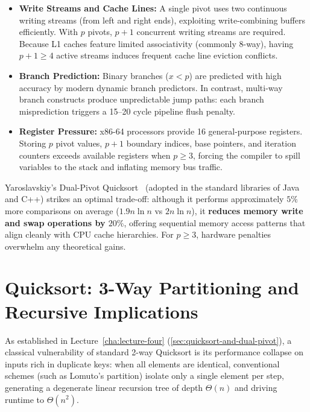 \begin{itemize}
  \item \textbf{Write Streams and Cache Lines:} A single pivot uses two continuous writing streams (from left and right ends), exploiting write-combining buffers efficiently. With $p$ pivots, $p+1$ concurrent writing streams are required. Because L1 caches feature limited associativity (commonly 8-way), having $p+1 \ge 4$ active streams induces frequent cache line eviction conflicts.
  \item \textbf{Branch Prediction:} Binary branches ($x < p$) are predicted with high accuracy by modern dynamic branch predictors. In contrast, multi-way branch constructs produce unpredictable jump paths: each branch misprediction triggers a 15--20 cycle pipeline flush penalty.
  \item \textbf{Register Pressure:} x86-64 processors provide 16 general-purpose registers. Storing $p$ pivot values, $p+1$ boundary indices, base pointers, and iteration counters exceeds available registers when $p \ge 3$, forcing the compiler to spill variables to the stack and inflating memory bus traffic.
\end{itemize}

\begin{property}[Why Dual-Pivot ($p=2$) Excels in Practice]
Yaroslavskiy's Dual-Pivot Quicksort~\cite{yaroslavskiy2009} (adopted in the standard libraries of Java and C++) strikes an optimal trade-off: although it performs approximately $5\%$ more comparisons on average ($1.9 n \ln n$ vs $2 n \ln n$), it \textbf{reduces memory write and swap operations by $20\%$}, offering sequential memory access patterns that align cleanly with CPU cache hierarchies. For $p \ge 3$, hardware penalties overwhelm any theoretical gains.
\end{property}

\FloatBarrier
\section{Quicksort: 3-Way Partitioning and Recursive Implications}
\label{sec:3way-partitioning}

As established in Lecture~\ref{cha:lecture-four} (\autoref{sec:quicksort-and-dual-pivot}), a classical vulnerability of standard 2-way Quicksort is its performance collapse on inputs rich in duplicate keys: when all elements are identical, conventional schemes (such as Lomuto's partition) isolate only a single element per step, generating a degenerate linear recursion tree of depth $\Theta(n)$ and driving runtime to $\Theta(n^2)$.

